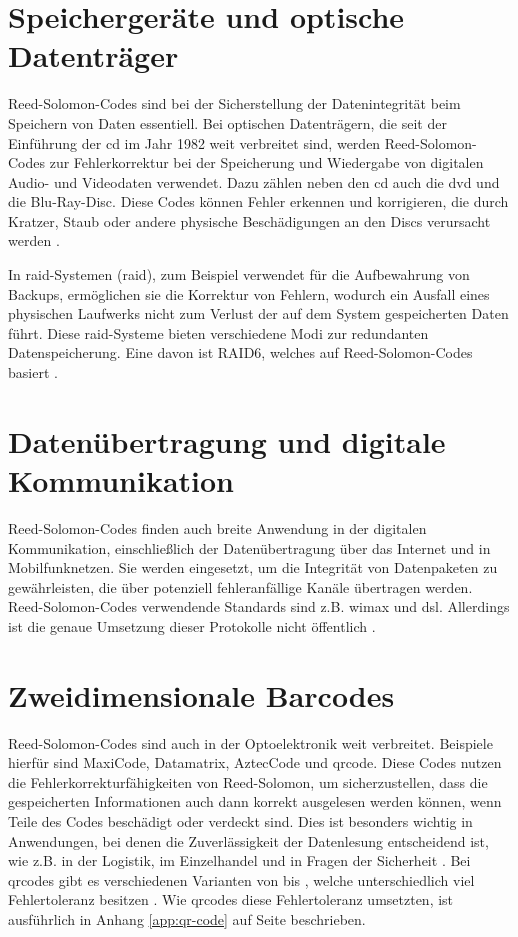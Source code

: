 \section{Speichergeräte und optische Datenträger}

Reed-Solomon-Codes sind bei der Sicherstellung der Datenintegrität beim Speichern von Daten essentiell. 
Bei optischen Datenträgern, die seit der Einführung der \acrfull{cd} im Jahr 1982 weit verbreitet sind, werden Reed-Solomon-Codes zur Fehlerkorrektur bei der Speicherung und Wiedergabe von digitalen Audio- und Videodaten verwendet. Dazu zählen neben den \acrshort{cd} auch die \acrfull{dvd} und die Blu-Ray-Disc. 
Diese Codes können Fehler erkennen und korrigieren, die durch Kratzer, Staub oder andere physische Beschädigungen an den Discs verursacht werden \cite{changReedSolomonProductCodeRSPC1998}. 

In \acrshort{raid}-Systemen (\acrlong{raid}), zum Beispiel verwendet für die Aufbewahrung von Backups, ermöglichen sie die Korrektur von Fehlern, wodurch ein Ausfall eines physischen Laufwerks nicht zum Verlust der auf dem System gespeicherten Daten führt.
Diese \acrshort{raid}-Systeme bieten verschiedene Modi zur redundanten Datenspeicherung.
Eine davon ist RAID6, welches auf Reed-Solomon-Codes basiert \cite{RAIDStorageTechnology2021}.

\section{Datenübertragung und digitale Kommunikation}

Reed-Solomon-Codes finden auch breite Anwendung in der digitalen Kommunikation, einschließlich der Datenübertragung über das Internet und in Mobilfunknetzen. 
Sie werden eingesetzt, um die Integrität von Datenpaketen zu gewährleisten, die über potenziell fehleranfällige Kanäle übertragen werden. 
Reed-Solomon-Codes verwendende Standards sind z.B. \acrshort{wimax} und \acrshort{dsl}.
Allerdings ist die genaue Umsetzung dieser Protokolle nicht öffentlich \cite[Kapitel 2]{vermillionEndtoEndDSLArchitectures2003}.

\section{Zweidimensionale Barcodes}

Reed-Solomon-Codes sind auch in der Optoelektronik weit verbreitet. Beispiele hierfür sind Maxi\-Code, Datamatrix, AztecCode und \acrshort{qrcode}. 
Diese Codes nutzen die Fehlerkorrekturfähigkeiten von Reed-Solomon, um sicherzustellen, dass die gespeicherten Informationen auch dann korrekt ausgelesen werden können, wenn Teile des Codes beschädigt oder verdeckt sind. 
Dies ist besonders wichtig in Anwendungen, bei denen die Zuverlässigkeit der Datenlesung entscheidend ist, wie z.B. in der Logistik, im Einzelhandel und in Fragen der Sicherheit \cite[Kapitel 3]{tiwariIntroductionQRCode2016}.
Bei \acrshort{qrcode}s gibt es verschiedenen Varianten von  bis , welche unterschiedlich viel Fehlertoleranz besitzen \cite{QRCode2024}.
Wie \acrshort{qrcode}s diese Fehlertoleranz umsetzten, ist ausführlich in Anhang \ref{app:qr-code} auf Seite \pageref{app:qr-code} beschrieben.